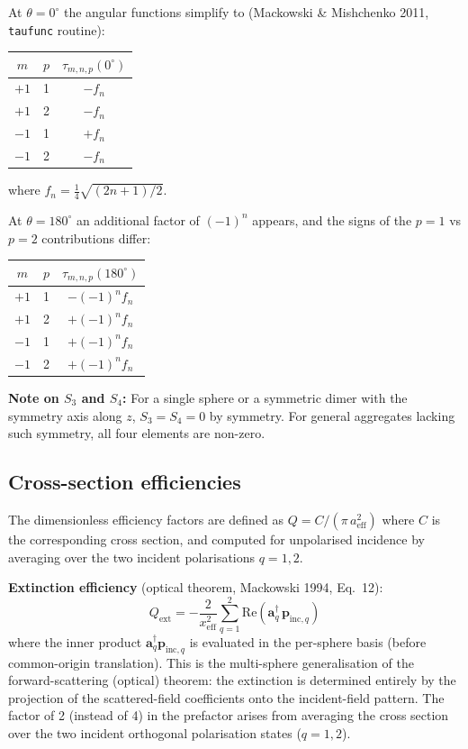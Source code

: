 \documentclass[11pt,a4paper]{article}
\begin{document}
At $\theta = 0^\circ$ the angular functions simplify to (Mackowski \& Mishchenko 2011, \texttt{taufunc} routine):

\begin{center}
\begin{tabular}{@{} ccc @{}}
  \toprule
  $m$ & $p$ & $\tau_{m,n,p}(0^\circ)$ \\
  \midrule
  $+1$ & 1 & $-f_n$ \\
  $+1$ & 2 & $-f_n$ \\
  $-1$ & 1 & $+f_n$ \\
  $-1$ & 2 & $-f_n$ \\
  \bottomrule
\end{tabular}
\end{center}
where $f_n = \frac{1}{4}\sqrt{(2n+1)/2}$.

At $\theta = 180^\circ$ an additional factor of $(-1)^n$ appears, and the signs of the $p = 1$ vs $p = 2$ contributions differ:

\begin{center}
\begin{tabular}{@{} ccc @{}}
  \toprule
  $m$ & $p$ & $\tau_{m,n,p}(180^\circ)$ \\
  \midrule
  $+1$ & 1 & $-(-1)^n f_n$ \\
  $+1$ & 2 & $+(-1)^n f_n$ \\
  $-1$ & 1 & $+(-1)^n f_n$ \\
  $-1$ & 2 & $+(-1)^n f_n$ \\
  \bottomrule
\end{tabular}
\end{center}

\textbf{Note on $S_3$ and $S_4$:}
For a single sphere or a symmetric dimer with the symmetry axis along $z$, $S_3 = S_4 = 0$ by symmetry.
For general aggregates lacking such symmetry, all four elements are non-zero.

\subsection{Cross-section efficiencies}

The dimensionless efficiency factors are defined as $Q = C / (\pi\,a_\mathrm{eff}^2)$ where $C$ is the corresponding cross section, and computed for unpolarised incidence by averaging over the two incident polarisations $q = 1, 2$.

\textbf{Extinction efficiency} (optical theorem, Mackowski 1994, Eq.~12):
\begin{equation}
  Q_\mathrm{ext} = -\frac{2}{x_\mathrm{eff}^2}
  \sum_{q=1}^{2} \mathrm{Re}\!\left(\bm{a}_q^\dagger \,\bm{p}_{\mathrm{inc},q}\right)
  \label{eq:qext}
\end{equation}
where the inner product $\bm{a}_q^\dagger \bm{p}_{\mathrm{inc},q}$ is evaluated in the per-sphere basis (before common-origin translation).
This is the multi-sphere generalisation of the forward-scattering (optical) theorem: the extinction is determined entirely by the projection of the scattered-field coefficients onto the incident-field pattern.
The factor of 2 (instead of 4) in the prefactor arises from averaging the cross section over the two incident orthogonal polarisation states ($q=1, 2$).
\end{document}
